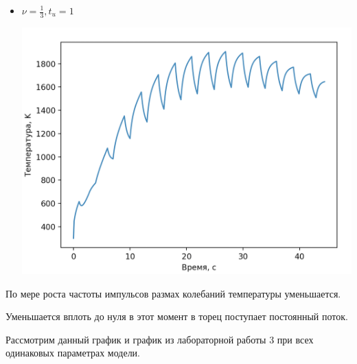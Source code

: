 \documentclass[a4paper,14pt]{extreport} %
\begin{document}
\begin{enumerate}
\begin{itemize}
\item $\nu=\frac{1}{3}, t_u=1$

\includegraphics[scale=0.7]{10}

\end{itemize}

По мере роста частоты импульсов размах колебаний температуры уменьшается. 

Уменьшается вплоть до нуля в этот момент в торец поступает постоянный поток. 

Рассмотрим данный график и график из лабораторной работы 3 при всех одинаковых параметрах модели. 


\end{enumerate}
\end{document}
